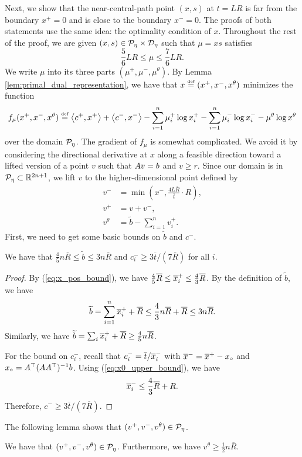 Next, we show that the near-central-path point $(x,s)$ at $t=LR$
is far from the boundary $x^{+}=0$ and is close to the boundary $x^{-}=0$.
The proofs of both statements use the same idea: the optimality condition
of $x$. Throughout the rest of the proof, we are given $(x,s)\in\mathcal{P}_{\eta}\times\mathcal{D}_{\eta}$
such that $\mu=xs$ satisfies
\[
\frac{5}{6}LR\leq\mu\leq\frac{7}{6}LR.
\]
We write $\mu$ into its three parts $(\mu^{+},\mu^{-},\mu^{\theta})$.
By Lemma \ref{lem:primal_dual_representation}, we have that $x\stackrel{\mathrm{{\scriptscriptstyle def}}}{=}(x^{+},x^{-},x^{\theta})$
minimizes the function
\[
f_{\mu}(x^{+},x^{-},x^{\theta})\stackrel{\mathrm{{\scriptscriptstyle def}}}{=}\left\langle c^{+},x^{+}\right\rangle +\left\langle c^{-},x^{-}\right\rangle -\sum^{n}_{i=1}\mu^{+}_{i}\log x^{+}_{i}-\sum^{n}_{i=1}\mu^{-}_{i}\log x^{-}_{i}-\mu^{\theta}\log x^{\theta}
\]
over the domain $\mathcal{P}_{\eta}$. The gradient of $f_{\mu}$ is somewhat
complicated. We avoid it by considering the directional derivative
at $x$ along a feasible direction toward a lifted version of a point
$v$ such that $A v=b$ and $v\geq r$. Since our domain is in $\mathcal{P}_{\eta}\subset\mathbb{R}^{2n+1}$,
we lift $v$ to the higher-dimensional point defined by
\begin{align*}
v^{-} & =\min(x^{-},\frac{4L\overline{R}}{\overline{t}}\cdot R),\\
v^{+} & =v+v^{-},\\
v^{\theta} & =\widetilde{b}-\sum^{n}_{i=1}v^{+}_{i}.
\end{align*}
First, we need to get some basic bounds on $\widetilde{b}$ and $c^{-}$.
\begin{lem}
\label{lem:ipm_propert_modified}We have that $\frac{4}{5}n\overline{R}\leq\widetilde{b}\leq3n\overline{R}$
and $c^{-}_{i}\geq3\overline{t}/(7\overline{R})$ for all $i$.
\end{lem}

\begin{proof}
By (\ref{eq:x_pos_bound}), we have $\frac{4}{5}\overline{R}\leq\overline{x}^{+}_{i}\leq\frac{4}{3}\overline{R}$.
By the definition of $\widetilde{b}$, we have
\[
\widetilde{b}=\sum^{n}_{i=1}\overline{x}^{+}_{i}+\overline{R}\leq\frac{4}{3}n\overline{R}+\overline{R}\leq3n\overline{R}.
\]
Similarly, we have $\widetilde{b}=\sum_{i}\overline{x}^{+}_{i}+\overline{R}\geq\frac{4}{5}n\overline{R}$. 

For the bound on $c^{-}_{i}$, recall that $c^{-}_{i}=\overline{t}/\overline{x}^{-}_{i}$
with $\overline{x}^{-}=\overline{x}^{+}-x_{\circ}$ and $x_{\circ}=A^{\top}(AA^{\top})^{-1}b$.
Using (\ref{eq:x0_upper_bound}), we have 
\[
\overline{x}^{-}_{i}\leq\frac{4}{3}\overline{R}+R.
\]
Therefore, $c^{-}\geq3\overline{t}/(7\overline{R})$.
\end{proof}
The following lemma shows that $(v^{+},v^{-},v^{\theta})\in\mathcal{P}_{\eta}$.
\begin{lem}
\label{lem:IPM_exact_inner_pt}We have that $(v^{+},v^{-},v^{\theta})\in\mathcal{P}_{\eta}$.
Furthermore, we have $v^{\theta}\geq\frac{1}{2}n\overline{R}$.
\end{lem}

